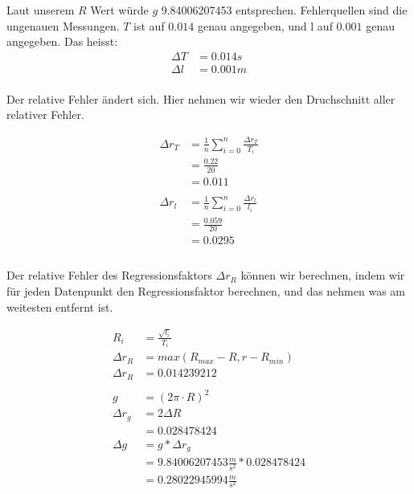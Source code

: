 \documentclass[12pt, a4paper, twoside]{article}
\begin{document}
Laut unserem $R$ Wert würde $g$ 9.84006207453 entsprechen. Fehlerquellen sind die ungenauen Messungen.
$T$ ist auf $0.014$ genau angegeben, und l auf $0.001$ genau angegeben.
Das heisst:
\begin{align*}
  \Delta T & = 0.014s \\
  \Delta l & = 0.001m \\
\end{align*}

Der relative Fehler ändert sich. Hier nehmen wir wieder den Druchschnitt aller relativer Fehler.

\begin{align*}
  \Delta r_T & = \frac{1}{n}\sum_{i=0}^{n}\frac{\Delta r_T}{T_i} \\
             & = \frac{0.22}{20}                                 \\
             & = 0.011                                           \\
  \\
  \Delta r_l & = \frac{1}{n}\sum_{i=0}^{n}\frac{\Delta r_l}{l_i} \\
             & = \frac{0.059}{20}                                \\
             & = 0.0295                                          \\
  \\
\end{align*}

Der relative Fehler des Regressionsfaktors $\Delta r_R$ können wir berechnen, indem wir für jeden Datenpunkt den Regressionsfaktor berechnen, und das nehmen was am weitesten entfernt ist.

\begin{align*}
  R_i        & = \frac{\sqrt{l_i}}{T_i}                   \\
  \Delta r_R & = max(R_{max} - R, r - R_{min})            \\
  \Delta r_R & = 0.014239212                              \\
  \\
  g          & = (2\pi\cdot R)^2                          \\
  \Delta r_g & = 2\Delta R                                \\
             & = 0.028478424                              \\
  \Delta g   & = g * \Delta r_g                           \\
             & = 9.84006207453\frac{m}{s^2} * 0.028478424 \\
             & = 0.28022945994\frac{m}{s^2}               \\
\end{align*}
\end{document}

